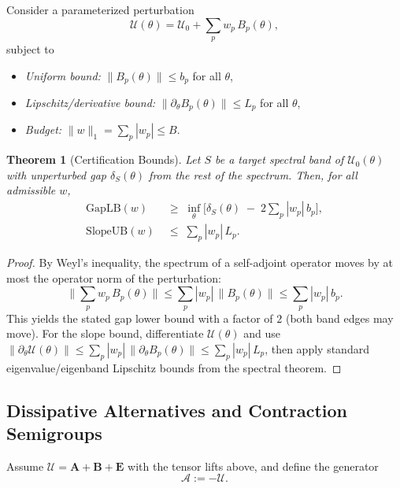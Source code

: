 \documentclass[12]{amsart}
\newtheorem{theorem}{Theorem}
\theoremstyle{plain}
\begin{document}
Consider a parameterized perturbation
\[
\mathcal U(\theta)=\mathcal U_0+\sum_{p} w_p\, B_p(\theta),
\]
subject to
\begin{itemize}
    \item \emph{Uniform bound:} $\|B_p(\theta)\|\le b_p$ for all $\theta$,
    \item \emph{Lipschitz/derivative bound:} $\|\partial_\theta B_p(\theta)\|\le L_p$ for all $\theta$,
    \item \emph{Budget:} $\|w\|_1=\sum_p |w_p|\le B$.
\end{itemize}

\begin{theorem}[Certification Bounds]
Let $S$ be a target spectral band of $\mathcal U_0(\theta)$ with unperturbed gap $\delta_S(\theta)$ from the rest of the spectrum. Then, for all admissible $w$,
\begin{align*}
\mathrm{GapLB}(w) &\;\ge\; \inf_{\theta}\Big[\delta_S(\theta)\;-\;2\sum_{p}|w_p|\,b_p\Big],\\
\mathrm{SlopeUB}(w) &\;\le\; \sum_{p}|w_p|\,L_p.
\end{align*}
\end{theorem}

\begin{proof}
By Weyl's inequality, the spectrum of a self-adjoint operator moves by at most the operator norm of the perturbation:
\[
\Big\|\sum_{p} w_p\,B_p(\theta)\Big\| \le \sum_{p}|w_p|\,\|B_p(\theta)\|\le \sum_{p}|w_p|\,b_p.
\]
This yields the stated gap lower bound with a factor of $2$ (both band edges may move). For the slope bound, differentiate $\mathcal U(\theta)$ and use $\|\partial_\theta \mathcal U(\theta)\|\le \sum_p |w_p|\,\|\partial_\theta B_p(\theta)\|\le \sum_p |w_p|\,L_p$, then apply standard eigenvalue/eigenband Lipschitz bounds from the spectral theorem.
\end{proof}


\subsection{Dissipative Alternatives and Contraction Semigroups}\label{sec:dissipative}

Assume $\mathcal U=\mathbf A+\mathbf B+\mathbf E$ with the tensor lifts above, and define the generator
\[
\mathcal A:=-\mathcal U.
\]
\end{document}
